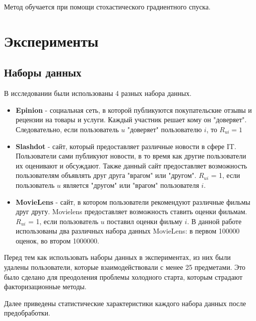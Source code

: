 \documentclass[a4paper,12pt]{article}
\begin{document}
Метод обучается при помощи стохастического градиентного спуска.


\section{Эксперименты}

\subsection{Наборы данных}
В исследовании были использованы 4 разных набора данных.

\begin{itemize}
\item \textbf{Epinion} - социальная сеть, в которой публикуются покупательские отзывы и рецензии на товары и услуги. Каждый участник  решает кому он "доверяет". Следовательно, если пользователь $u$ "доверяет" пользователю $i$, то $R_{ui} = 1$

\item \textbf{Slashdot} - сайт, который предоставляет различные новости в сфере IT. Пользователи сами публикуют новости, в то время как другие пользователи их оценивают и обсуждают. Также данный сайт предоставляет возможность пользователям объявлять друг друга "врагом" или "другом".  $R_{ui}$ = 1, если пользователь $u$ является "другом" или "врагом" пользователя $i$.

\item \textbf{MovieLens} - сайт, в котором пользователи рекомендуют различные фильмы друг другу. Movielens предоставляет возможность ставить оценки фильмам. $R_{ui}$ = 1, если пользователь $u$ поставил оценки фильму $i$. В данной работе использованы два различных набора данных MovieLens: в первом 100000 оценок, во втором 1000000.

\end{itemize}

Перед тем как использовать наборы данных в экспериментах, из них были удалены пользователи, которые взаимодействовали с менее  25 предметами. Это было сделано для преодоления проблемы холодного старта, которым страдают факторизационные методы. 

Далее приведены статистические характеристики каждого набора данных после предобработки. 
\end{document}
